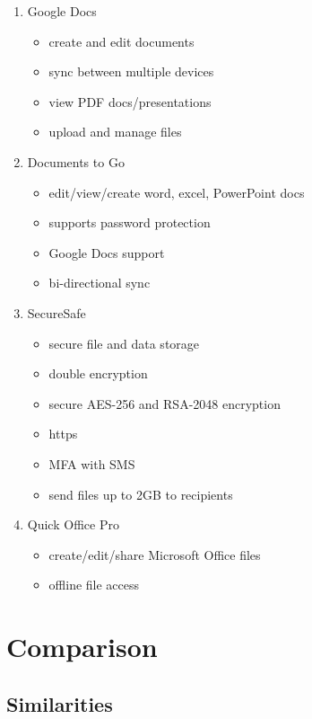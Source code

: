 \begin{enumerate}
    \item Google Docs
        \begin{itemize}
            \item create and edit documents
            \item sync between multiple devices
            \item view PDF docs/presentations
            \item upload and manage files
        \end{itemize}
    \item Documents to Go
        \begin{itemize}
            \item edit/view/create word, excel, PowerPoint docs
            \item supports password protection
            \item Google Docs support
            \item bi-directional sync
        \end{itemize}
    \item SecureSafe
        \begin{itemize}
            \item secure file and data storage
            \item double encryption
            \item secure AES-256 and RSA-2048 encryption
            \item https
            \item MFA with SMS
            \item send files up to 2GB to recipients
        \end{itemize}
    \item Quick Office Pro
        \begin{itemize}
            \item create/edit/share Microsoft Office files
            \item offline file access
        \end{itemize}
    \end{enumerate}

\section{Comparison}

    \subsection{Similarities}


